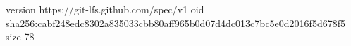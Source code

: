 version https://git-lfs.github.com/spec/v1
oid sha256:cabf248edc8302a835033cbb80aff965b0d07d4dc013c7bc5e0d2016f5d678f5
size 78
